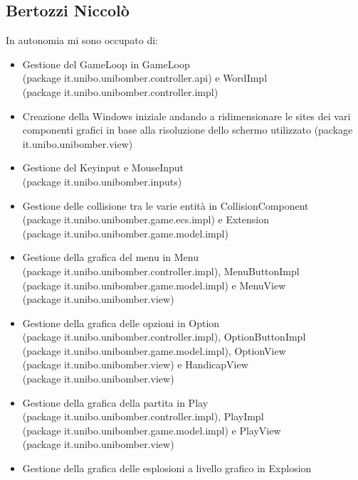 \documentclass[a4paper,12pt]{report}
\begin{document}
\subsection*{Bertozzi Niccolò}
In autonomia mi sono occupato di:
\begin{itemize}
    \item Gestione del GameLoop in GameLoop 
        \\(package it.unibo.unibomber.controller.api) e WordImpl 
        \\(package it.unibo.unibomber.controller.impl)
    \item Creazione della Windows iniziale andando a ridimensionare le sites dei vari componenti grafici in base alla risoluzione dello schermo utilizzato (package it.unibo.unibomber.view)
    \item Gestione del Keyinput e MouseInput 
    \\(package it.unibo.unibomber.inputs)
    \item Gestione delle collisione tra le varie entità in CollisionComponent 
    \\(package it.unibo.unibomber.game.ecs.impl) e Extension 
    \\(package it.unibo.unibomber.game.model.impl)
    \item Gestione della grafica del menu in Menu 
    \\(package it.unibo.unibomber.controller.impl), MenuButtonImpl 
    \\(package it.unibo.unibomber.game.model.impl) e MenuView 
    \\(package it.unibo.unibomber.view)
    \item Gestione della grafica delle opzioni in Option 
    \\(package it.unibo.unibomber.controller.impl), OptionButtonImpl 
    \\(package it.unibo.unibomber.game.model.impl), OptionView
    \\(package it.unibo.unibomber.view) e HandicapView 
    \\(package it.unibo.unibomber.view)
    \item Gestione della grafica della partita in Play 
    \\(package it.unibo.unibomber.controller.impl), PlayImpl 
    \\(package it.unibo.unibomber.game.model.impl) e PlayView 
    \\(package it.unibo.unibomber.view)
    \item Gestione della grafica delle esplosioni a livello grafico  in Explosion 

\end{itemize}
\end{document}
